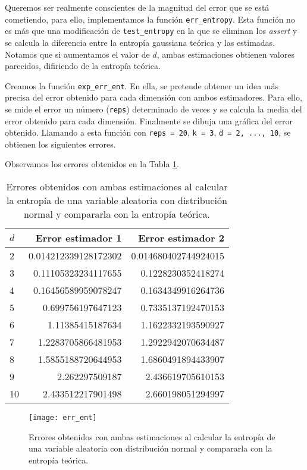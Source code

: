 \documentclass[10pt,a4paper]{article} %
\theoremstyle{definition}
\begin{document}
Queremos ser realmente conscientes de la magnitud del error que se está cometiendo, para ello, implementamos la función \texttt{err\_entropy}. Esta función no es más que una modificación de \texttt{test\_entropy} en la que se eliminan los \textit{assert} y se calcula la diferencia entre la entropía gaussiana teórica y las estimadas. Notamos que si aumentamos el valor de $d$, ambas estimaciones obtienen valores parecidos, difiriendo de la entropía teórica.

Creamos la función \texttt{exp\_err\_ent}. En ella, se pretende obtener un idea más precisa del error obtenido para cada dimensión con ambos estimadores. Para ello, se mide el error un número (\texttt{reps}) determinado de veces y se calcula la media del error obtenido para cada dimensión. Finalmente se dibuja una gráfica del error obtenido. Llamando a esta función con \texttt{reps = 20}, \texttt{k = 3}, \texttt{d = 2, ..., 10}, se obtienen los siguientes errores.

Observamos los errores obtenidos en la Tabla \ref{tab:err_ent}.

\begin{table}[H]
\large
\centering
\caption{Errores obtenidos con ambas estimaciones al calcular la entropía de una variable aleatoria con distribución normal y compararla con la entropía teórica.}
\label{tab:err_ent}
\begin{tabular}{lrr}
\toprule
$d$ & Error estimador 1 & Error estimador 2\\ \midrule
2 & 0.014212339128172302 & 0.014680402744924015\\
3 & 0.11105323234117655 & 0.1228230352418274\\
4 & 0.16456589959078247 & 0.1634349916264736\\
5 & 0.699756197647123 & 0.7335137192470153\\
6 & 1.11385415187634 & 1.1622332193590927\\
7 & 1.2283705866481953 & 1.2922942070634487\\
8 & 1.5855188720644953 & 1.6860491894433907\\
9 & 2.262297509187 & 2.436619705610153\\
10 & 2.433512217901498 & 2.660198051294997\\
\bottomrule
\end{tabular}
\end{table}

\begin{figure}[H]
    \centering
    \texttt{[image: err\_ent]}
    \caption{Errores obtenidos con ambas estimaciones al calcular la entropía de una variable aleatoria con distribución normal y compararla con la entropía teórica.}
    \label{fig:err_ent}
\end{figure}
\end{document}
